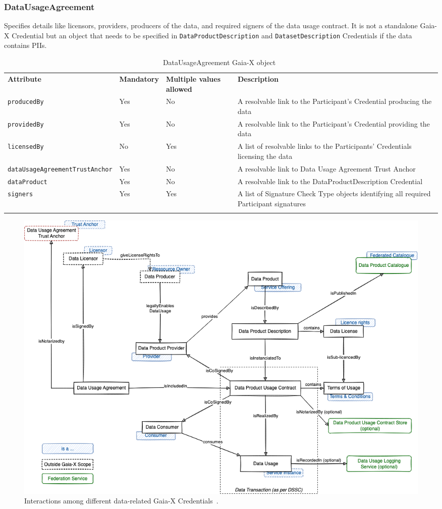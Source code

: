 \subsubsection{DataUsageAgreement}
Specifies details like licensors, providers, producers of the data, and required signers of the data usage contract.
It is not a standalone Gaia-X Credential but an object that needs to be specified in \texttt{DataProductDescription} and \texttt{DatasetDescription} Credentials if the data contains PIIs.

\begin{longtable}{ |p{4cm}|p{2cm}|p{2cm}|p{7cm}| }
    \hhline{----}
    \textbf{Attribute} & \textbf{Mandatory} & \textbf{Multiple values allowed} & \textbf{Description}\\
    \hhline{----}
    \texttt{producedBy} & Yes & No & A resolvable link to the Participant's Credential producing the data\\
    \hhline{----}
    \texttt{providedBy} & Yes & No & A resolvable link to the Participant's Credential providing the data\\
    \hhline{----}
    \texttt{licensedBy} & No & Yes & A list of resolvable links to the Participants' Credentials licensing the data\\
    \hhline{----}
    \texttt{dataUsageAgreementTrustAnchor} & Yes & No & A resolvable link to Data Usage Agreement Trust Anchor\\
    \hhline{----}
    \texttt{dataProduct} & Yes & No & A resolvable link to the DataProductDescription Credential\\
    \hhline{----}
    \texttt{signers} & Yes & Yes & A list of Signature Check Type objects identifying all required Participant signatures\\
    \hhline{----}
    \caption{DataUsageAgreement Gaia-X object~\cite{gaiax_data_exchange_document}}
    \label{tab:data_usage_agreement}
\end{longtable}

\begin{figure}
    \centering
    \includegraphics[width=\textwidth]{figures/data-product-conceptual-model.png}
    \caption{Interactions among different data-related Gaia-X Credentials~\cite{gaiax_architecture_document}.}\label{fig:data_product_conteptual_model}
\end{figure}

